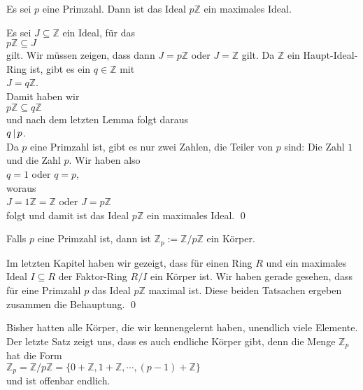 \begin{Satz}
  Es sei $p$ eine Primzahl.  Dann ist das Ideal $p\mathbb{Z}$ ein maximales Ideal.
\end{Satz}

\proof
Es sei $J \subseteq \mathbb{Z}$ ein Ideal, f\"{u}r das
\\[0.2cm]
\hspace*{1.3cm}
$p\mathbb{Z} \subseteq J$ 
\\[0.2cm]
gilt.  Wir m\"{u}ssen zeigen, dass dann $J = p\mathbb{Z}$ oder $J = \mathbb{Z}$ gilt.  Da $\mathbb{Z}$ ein
Haupt-Ideal-Ring ist, gibt es ein $q \in \mathbb{Z}$ mit
\\[0.2cm]
\hspace*{1.3cm}
$J = q\mathbb{Z}$.
\\[0.2cm]
Damit haben wir 
\\[0.2cm]
\hspace*{1.3cm}
$p\mathbb{Z} \subseteq q\mathbb{Z}$
\\[0.2cm]
und nach dem letzten Lemma folgt daraus
\\[0.2cm]
\hspace*{1.3cm}
$q \,|\, p$.
\\[0.2cm]
Da $p$ eine Primzahl ist, gibt es nur zwei Zahlen, die Teiler von $p$ sind: Die Zahl $1$ und die Zahl $p$.
Wir haben also
\\[0.2cm]
\hspace*{1.3cm}
$q = 1$ \quad oder \quad $q = p$,
\\[0.2cm]
woraus
\\[0.2cm]
\hspace*{1.3cm}
$J = 1\mathbb{Z} = \mathbb{Z}$ \quad oder \quad $J = p\mathbb{Z}$
\\[0.2cm]
folgt und damit ist das Ideal $p\mathbb{Z}$ ein maximales Ideal.  \qed

\begin{Korollar}
Falls $p$ eine Primzahl ist, dann ist $\mathbb{Z}_p := \mathbb{Z}/p\mathbb{Z}$ ein K\"{o}rper.
\end{Korollar}

\proof
Im letzten Kapitel haben wir gezeigt, dass f\"{u}r einen Ring $R$ und ein maximales Ideal
$I \subseteq R$ der Faktor-Ring $R/I$ ein K\"{o}rper ist.  Wir haben gerade gesehen, dass f\"{u}r eine Primzahl
$p$ das Ideal $p\mathbb{Z}$ maximal ist.  Diese beiden Tatsachen ergeben zusammen die Behauptung. \qed

\remark
Bisher hatten alle K\"{o}rper, die wir kennengelernt haben, unendlich viele Elemente.
Der letzte Satz zeigt uns, dass es auch endliche K\"{o}rper gibt, denn die Menge $\mathbb{Z}_p$ hat
die Form
\\[0.2cm]
\hspace*{1.3cm}
$\mathbb{Z}_p = \mathbb{Z} / p\mathbb{Z} = \bigl\{0 + \mathbb{Z}, 1 + \mathbb{Z}, \cdots, (p-1) + \mathbb{Z} \bigr\}$
\\[0.2cm]
und ist offenbar endlich. \eoxs


